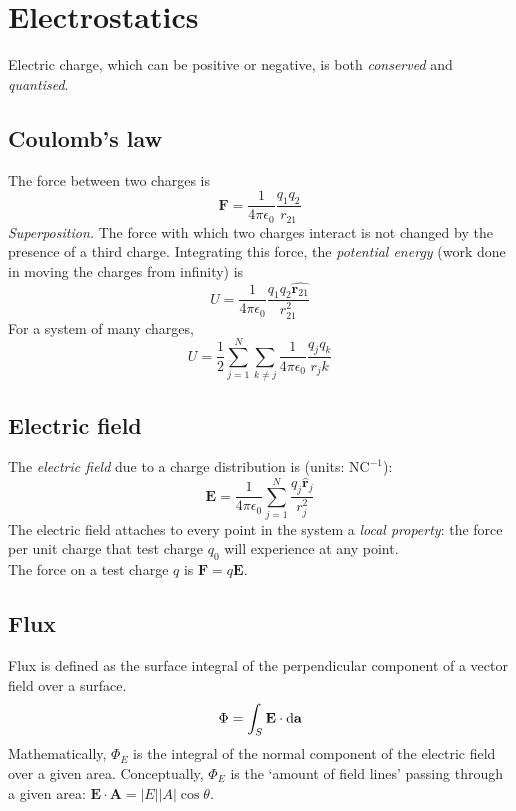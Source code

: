 
\section{Electrostatics}

Electric charge, which can be positive or negative, is both \textit{conserved} and \textit{quantised}.

\subsection*{Coulomb's law}
The force between two charges is
\begin{equation*}
  \mathbf{F} = \frac{1}{4\pi\epsilon_0}\frac{q_1q_2}{r_{21}}
\end{equation*}
\textit{Superposition.} The force with which two charges interact is not changed by the presence of a third charge. 
Integrating this force, the \textit{potential energy} (work done in moving the charges from infinity) is
\begin{equation*}
  U = \frac{1}{4\pi\epsilon_0}\frac{q_1q_2\hat{\mathbf{r}_{21}}}{r^2_{21}}
\end{equation*}
For a system of many charges,
\begin{equation*}
  U = \frac{1}{2}\sum_{j=1}^{N}\sum_{k \neq j}^{} \frac{1}{4\pi\epsilon_0}\frac{q_j q_k}{r_jk}
\end{equation*}
\subsection*{Electric field}
The \textit{electric field} due to a charge distribution is (units: $\mathrm{NC}^{-1}$):
\begin{equation*}
  \mathbf{E} = \frac{1}{4\pi\epsilon_0} \sum_{j=1}^{N} \frac{q_j\hat{\mathbf{r}}_j}{r^2_j}
\end{equation*}
The electric field attaches to every point in the system a \textit{local property}: the force per unit charge that test charge $q_0$ will experience at any point.\\
The force on a test charge $q$ is $\mathbf{F} = q \mathbf{E}$. \\
\subsection*{Flux}
Flux is defined as the surface integral of the perpendicular component of a vector field over a surface. 
\begin{equation*}
  \Phi = \int_S \mathbf{E} \cdot \differential \mathbf{a}
\end{equation*}
Mathematically, $\Phi_E$ is the integral of the normal component of the electric field over a given area. 
Conceptually, $\Phi_E$ is the `amount of field lines' passing through a given area: $\mathbf{E} \cdot \mathbf{A} = |E||A|\cos \theta$.

